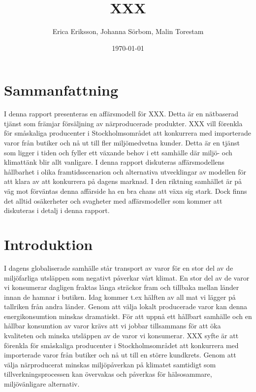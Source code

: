 \documentclass[10pt,a4paper,oneside]{article}
\title{XXX}
\author{Erica Eriksson, Johanna Sörbom, Malin Torestam}
\date{\today}
\begin{document}
\maketitle
\newpage

\section{Sammanfattning}
I denna rapport presenteras en affärsmodell för XXX. Detta är en nätbaserad tjänst som främjar försäljning av närproducerade produkter. XXX vill förenkla för småskaliga producenter i Stockholmsområdet att konkurrera med importerade varor från butiker och nå ut till fler miljömedvetna kunder. Detta är en tjänst som ligger i tiden och fyller ett växande behov i ett samhälle där miljö- och klimattänk blir allt vanligare. I denna rapport diskuteras affärsmodellens hållbarhet i olika framtidsscenarion och alternativa utvecklingar av modellen för att klara av att konkurrera på dagens marknad. I den riktning samhället är på väg mot förväntas denna affärside ha en bra chans att växa sig stark. Dock finns det alltid osäkerheter och svagheter med affärsmodeller som kommer att diskuteras i detalj i denna rapport. 
\newpage

\tableofcontents
\newpage

\section{Introduktion}
I dagens globaliserade samhälle står transport av varor för en stor del av de miljöfarliga utsläppen som negativt påverkar vårt klimat. En stor del av de varor vi konsumerar dagligen fraktas långa sträckor fram och tillbaka mellan länder innan de hamnar i butiken. Idag kommer t.ex hälften av all mat vi lägger på tallriken från andra länder. Genom att välja lokalt producerade varor kan denna energikonsumtion minskas dramatiskt. För att uppnå ett hållbart samhälle och en hållbar konsumtion av varor krävs att vi jobbar tillsammans för att öka kvaliteten och minska utsläppen av de varor vi konsumerar. XXX syfte är att förenkla för småskaliga producenter i Stockholmsområdet att konkurrera med importerade varor från butiker och nå ut till en större kundkrets. Genom att välja närproducerat minskas miljöpåverkan på klimatet samtidigt som tillverkningsprocessen kan övervakas och påverkas för hälsosammare, miljövänligare alternativ. 

\newpage
\end{document}
